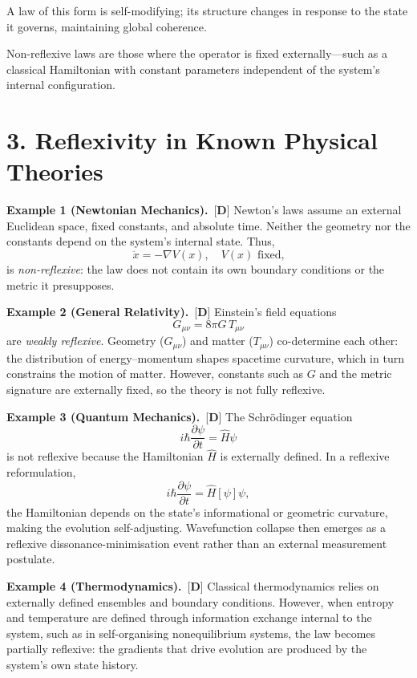 \documentclass[11pt]{article}
\newcommand{\CatD}{\textbf{D}}
\begin{document}
A law of this form is self-modifying; its structure changes in response
to the state it governs, maintaining global coherence.

Non-reflexive laws are those where the operator is fixed
externally---such as a classical Hamiltonian with constant parameters
independent of the system's internal configuration.

\section*{3. Reflexivity in Known Physical Theories}

\textbf{Example 1 (Newtonian Mechanics).}~[$\CatD$]
Newton's laws assume an external Euclidean space, fixed constants, and
absolute time.
Neither the geometry nor the constants depend on the system's internal
state.
Thus,
\[
\ddot{x} = -\nabla V(x), \quad V(x) \text{ fixed,}
\]
is \emph{non-reflexive}: the law does not contain its own boundary
conditions or the metric it presupposes.

\vspace{0.3cm}

\textbf{Example 2 (General Relativity).}~[$\CatD$]
Einstein's field equations
\[
G_{\mu\nu} = 8\pi G\,T_{\mu\nu}
\]
are \emph{weakly reflexive}.
Geometry (\(G_{\mu\nu}\)) and matter (\(T_{\mu\nu}\)) co-determine each
other: the distribution of energy--momentum shapes spacetime curvature,
which in turn constrains the motion of matter.
However, constants such as \(G\) and the metric signature are externally
fixed, so the theory is not fully reflexive.

\vspace{0.3cm}

\textbf{Example 3 (Quantum Mechanics).}~[$\CatD$]
The Schr\"{o}dinger equation
\[
i\hbar \frac{\partial \psi}{\partial t} = \hat{H}\psi
\]
is not reflexive because the Hamiltonian \(\hat{H}\) is externally
defined.
In a reflexive reformulation,
\[
i\hbar \frac{\partial \psi}{\partial t} = \hat{H}[\psi]\psi,
\]
the Hamiltonian depends on the state's informational or geometric
curvature, making the evolution self-adjusting.
Wavefunction collapse then emerges as a reflexive
dissonance-minimisation event rather than an external measurement
postulate.

\vspace{0.3cm}

\textbf{Example 4 (Thermodynamics).}~[$\CatD$]
Classical thermodynamics relies on externally defined ensembles and
boundary conditions.
However, when entropy and temperature are defined through information
exchange internal to the system, such as in self-organising
nonequilibrium systems, the law becomes partially reflexive: the
gradients that drive evolution are produced by the system's own state
history.
\end{document}
